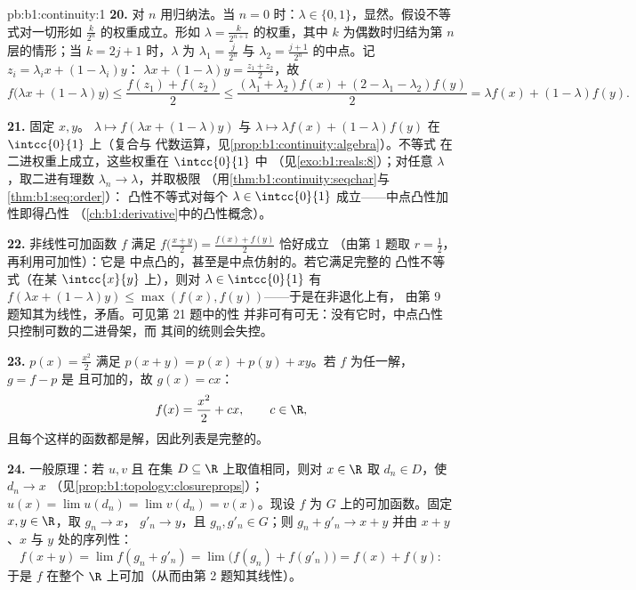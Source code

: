 \begin{solution}{pb:b1:continuity:1}
\textbf{20.} 对 $n$ 用归纳法。当 $n = 0$ 时：$\lambda \in \{0,
1\}$，显然。假设不等式对一切形如
$\frac{k}{2^n}$ 的权重成立。形如 $\lambda = \frac{k}{2^{n+1}}$ 的权重，其中 $k$
为偶数时归结为第 $n$ 层的情形；当 $k = 2j + 1$ 时，$\lambda$
为 $\lambda_1 = \frac{j}{2^n}$ 与 $\lambda_2 =
\frac{j+1}{2^n}$ 的中点。记 $z_i = \lambda_i x + (1 - \lambda_i)y$：
$\lambda x + (1-\lambda)y = \frac{z_1 + z_2}{2}$，故
\[
f\bigl(\lambda x + (1{-}\lambda)y\bigr)
\leq \frac{f(z_1) + f(z_2)}{2}
\leq \frac{(\lambda_1 + \lambda_2)f(x) + (2 - \lambda_1 -
\lambda_2)f(y)}{2}
= \lambda f(x) + (1 - \lambda)f(y) .
\]

\textbf{21.} 固定 $x, y$。 $\lambda \mapsto f(\lambda x +
(1 - \lambda)y)$ 与 $\lambda \mapsto \lambda f(x) + (1 -
\lambda)f(y)$ 在 $\intcc{0}{1}$ 上（复合与
代数运算，见\cref{prop:b1:continuity:algebra}）。不等式
在二进权重上成立，这些权重在 $\intcc{0}{1}$ 中
（见\cref{exo:b1:reals:8}）；对任意 $\lambda$，取二进有理数
$\lambda_n \to \lambda$，并取极限
（用\cref{thm:b1:continuity:seqchar}与\cref{thm:b1:seq:order}）：
凸性不等式对每个 $\lambda \in
\intcc{0}{1}$ 成立——中点凸性加性即得凸性
（\cref{ch:b1:derivative}中的凸性概念）。

\textbf{22.} 非线性可加函数 $f$ 满足
$f\bigl(\frac{x+y}{2}\bigr) = \frac{f(x) + f(y)}{2}$ 恰好成立
（由第 1 题取 $r = \frac12$，再利用可加性）：它是
中点凸的，甚至是中点仿射的。若它满足完整的
凸性不等式（在某 $\intcc{x}{y}$ 上），则对
$\lambda \in \intcc{0}{1}$ 有 $f(\lambda x + (1-\lambda)y) \leq
\max(f(x), f(y))$——于是在非退化上有，
由第 9 题知其为线性，矛盾。可见第 21 题中的性
并非可有可无：没有它时，中点凸性
只控制可数的二进骨架，而
其间的统则会失控。

\textbf{23.} $p(x) = \frac{x^2}{2}$ 满足 $p(x+y) = p(x) +
p(y) + xy$。若 $f$ 为任一解，$g = f - p$ 是
且可加的，故 $g(x) = cx$：
\[
f(x) = \frac{x^2}{2} + cx , \qquad c \in \R ,
\]
且每个这样的函数都是解，因此列表是完整的。

\textbf{24.} 一般原理：若 $u, v$ 且
在集 $D \subseteq \R$ 上取值相同，则对 $x \in \R$ 取
$d_n \in D$，使 $d_n \to x$
（见\cref{prop:b1:topology:closureprops}）；$u(x) = \lim u(d_n) =
\lim v(d_n) = v(x)$。现设 $f$ 为
 $G$ 上的可加函数。固定 $x, y \in \R$，取 $g_n \to x$，
$g'_n \to y$，且 $g_n, g'_n \in G$；则 $g_n + g'_n \to x + y$
并由 $x + y$、$x$ 与 $y$ 处的序列性：
\[
f(x + y) = \lim f(g_n + g'_n) = \lim\bigl(f(g_n) +
f(g'_n)\bigr) = f(x) + f(y) :
\]
于是 $f$ 在整个 $\R$ 上可加（从而由第 2 题知其线性）。


\end{solution}
